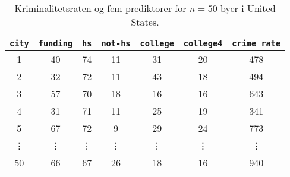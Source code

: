\begin{table}[ht] 
\centering 
\begin{tabular}{c|cccccc} 
\texttt{city} & \texttt{funding} & \texttt{hs} & \texttt{not-hs} & \texttt{college} & \texttt{college4} & \texttt{crime rate} \\
\midrule
1 & 40 & 74 & 11 & 31 & 20 & 478 \\
2 & 32 & 72 & 11 & 43 & 18 & 494 \\
3 & 57 & 70 & 18 & 16 & 16 & 643 \\
4 & 31 & 71 & 11 & 25 & 19 & 341 \\
5 & 67 & 72 & 9 & 29 & 24 & 773 \\
\vdots & \vdots & \vdots & \vdots & \vdots & \vdots & \vdots \\
50 & 66 & 67 & 26 & 18 & 16 & 940 \\
\bottomrule
\end{tabular}  
\caption{Kriminalitetsraten og fem prediktorer for \(n=50\) byer i United States.} \label{tab:crime} 
\end{table} 